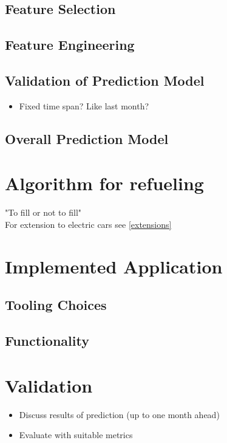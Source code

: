 \documentclass[%
a4paper,
DIV12,
2.5headlines,
bigheadings,
titlepage,
openbib,
]{scrartcl}
\begin{document}
\subsection{Feature Selection}\label{feature-selection}



\subsection{Feature Engineering}\label{feature-engineering}



\subsection{Validation of Prediction
Model}\label{validation-of-prediction-model}
\begin{itemize}
\item Fixed time span? Like last month?
\end{itemize}


\subsection{Overall Prediction Model}\label{overall-prediction-model}

\section{Algorithm for refueling}
"To fill or not to fill"\cite{khuller2007fill}\\
For extension to electric cars see \ref{extensions}

\section{Implemented Application}\label{implemented-application}
\subsection{Tooling Choices}\label{tooling-choices}



\subsection{Functionality}\label{functionality}



\section{Validation}\label{validation}
\begin{itemize}
\item Discuss results of prediction (up to one month ahead)
\item Evaluate with suitable metrics
\end{itemize}
\end{document}
